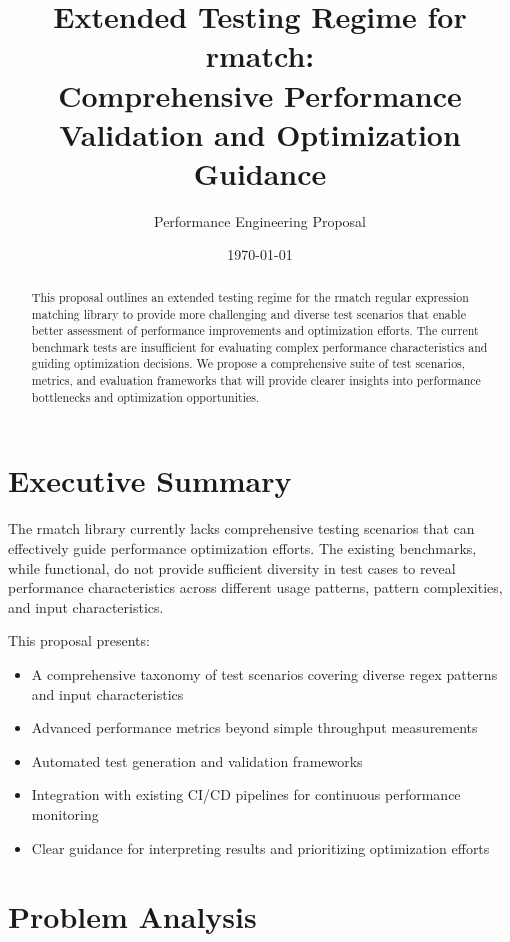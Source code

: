 \documentclass[11pt,a4paper]{article}
\title{Extended Testing Regime for rmatch:\\Comprehensive Performance Validation and Optimization Guidance}
\author{Performance Engineering Proposal}
\date{\today}
\begin{document}
\maketitle

\begin{abstract}
This proposal outlines an extended testing regime for the rmatch regular expression matching library to provide more challenging and diverse test scenarios that enable better assessment of performance improvements and optimization efforts. The current benchmark tests are insufficient for evaluating complex performance characteristics and guiding optimization decisions. We propose a comprehensive suite of test scenarios, metrics, and evaluation frameworks that will provide clearer insights into performance bottlenecks and optimization opportunities.
\end{abstract}

\tableofcontents
\newpage

\section{Executive Summary}

The rmatch library currently lacks comprehensive testing scenarios that can effectively guide performance optimization efforts. The existing benchmarks, while functional, do not provide sufficient diversity in test cases to reveal performance characteristics across different usage patterns, pattern complexities, and input characteristics.

This proposal presents:
\begin{itemize}
    \item A comprehensive taxonomy of test scenarios covering diverse regex patterns and input characteristics
    \item Advanced performance metrics beyond simple throughput measurements
    \item Automated test generation and validation frameworks
    \item Integration with existing CI/CD pipelines for continuous performance monitoring
    \item Clear guidance for interpreting results and prioritizing optimization efforts
\end{itemize}

\section{Problem Analysis}
\end{document}
